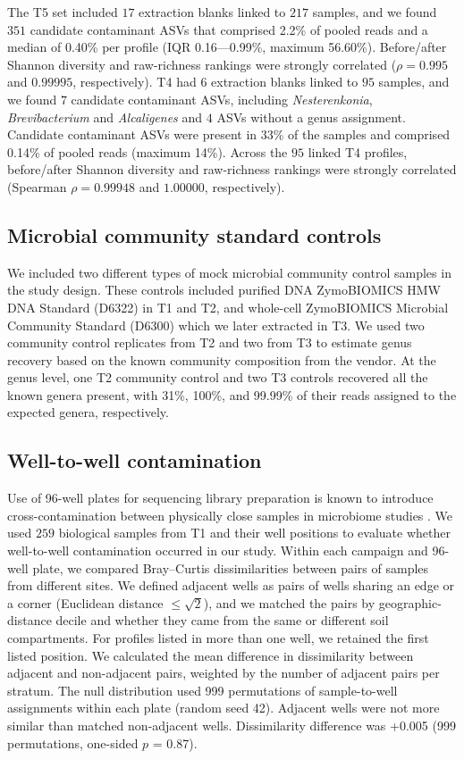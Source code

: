 \documentclass[11pt]{article}
\begin{document}
The T5 set included $17$ extraction blanks linked to $217$ samples, and we found $351$ candidate contaminant ASVs that comprised 2.2\% of pooled reads and a median of 0.40\% per profile (IQR 0.16—0.99\%, maximum 56.60\%). Before/after Shannon diversity and raw-richness rankings were strongly correlated ($\rho = 0.995$ and $0.99995$, respectively). T4 had $6$ extraction blanks linked to $95$ samples, and we found $7$ candidate contaminant ASVs, including \textit{Nesterenkonia}, \textit{Brevibacterium} and \textit{Alcaligenes} and $4$ ASVs without a genus assignment. Candidate contaminant ASVs were present in 33\% of the samples and comprised 0.14\% of pooled reads (maximum 14\%). Across the $95$ linked T4 profiles, before/after Shannon diversity and raw-richness rankings were strongly correlated (Spearman $\rho=0.99948$ and $1.00000$, respectively).


\subsection{Microbial community standard controls}
We included two different types of mock microbial community control samples in the study design. These controls included purified DNA ZymoBIOMICS HMW DNA Standard (D6322) in T1 and T2, and whole-cell ZymoBIOMICS Microbial Community Standard (D6300) which we later extracted in T3. We used two community control replicates from T2 and two from T3 to estimate genus recovery based on the known community composition from the vendor. At the genus level, one T2 community control and two T3 controls recovered all the known genera present, with 31\%, 100\%, and  99.99\% of their reads assigned to the expected genera, respectively.

\subsection{Well-to-well contamination}
Use of 96-well plates for sequencing library preparation is known to introduce cross-contamination between physically close samples in microbiome studies \cite{welltowell}. We used $259$ biological samples from T1 and their well positions to evaluate whether well-to-well contamination occurred in our study. Within each campaign and 96-well plate, we compared Bray--Curtis dissimilarities between pairs of samples from different sites. We defined adjacent wells as pairs of wells sharing an edge or a corner (Euclidean distance $\le \sqrt{2}$), and we matched the pairs by geographic-distance decile and whether they came from the same or different soil compartments. For profiles listed in more than one well, we retained the first listed position. We calculated the mean difference in dissimilarity between adjacent and non-adjacent pairs, weighted by the number of adjacent pairs per stratum. The null distribution used 999 permutations of sample-to-well assignments within each plate (random seed 42). Adjacent wells were not more similar than matched non-adjacent wells. Dissimilarity difference was +0.005 (999 permutations, one-sided $p$ = 0.87).
\end{document}
